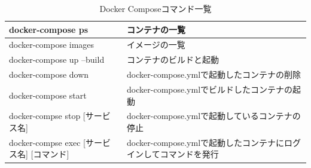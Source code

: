 \begin{table}[htb]
    \begin{center}
        \caption{Docker Composeコマンド一覧}
        \begin{tabularx}{\textwidth}{|l|X|}\hline
            docker-compose ps & コンテナの一覧 \\ \hline
            docker-compose images & イメージの一覧 \\ \hline
            docker-compose up --build & コンテナのビルドと起動 \\ \hline
            docker-compose down & docker-compose.ymlで起動したコンテナの削除 \\ \hline
            docker-compose start & docker-compose.ymlでビルドしたコンテナの起動 \\ \hline
            docker-compse stop [サービス名] & docker-compose.ymlで起動しているコンテナの停止 \\ \hline
            docker-compse exec [サービス名] [コマンド] & docker-compose.ymlで起動したコンテナにログインしてコマンドを発行 \\ \hline 
        \end{tabularx}
        \label{docker-compose_command}
    \end{center}
\end{table}



